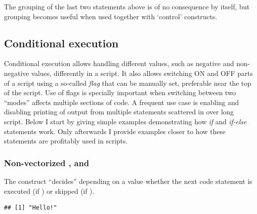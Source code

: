 \documentclass[krantz2]{krantz}\usepackage{knitr}%
\begin{document}
The grouping of the last two statements above is of no consequence by itself, but grouping becomes useful when used together with `control' constructs.

\subsection{Conditional execution}

Conditional execution allows handling different values, such as negative and non-negative values, differently in a script. It also allows switching ON and OFF parts of a script using a so-called \emph{flag} that can be manually set, preferable near the top of the script. Use of flags is specially important when switching between two ``modes'' affects multiple sections of code. A frequent use case is enabling and disabling printing of output from multiple statements scattered in over long script. Below I start by giving simple examples demonstrating how \emph{if} and \emph{if-else} statements work. Only afterwards I provide examples closer to how these statements are profitably used in \Rlang scripts.

\subsubsection[Non-vectorized \texttt{if}, \texttt{else} and \texttt{switch}]{Non-vectorized ,  and }
%

The  construct ``decides'' depending on a  value whether the next code statement is executed (if ) or skipped (if ).

\begin{knitrout}\footnotesize
{}\color{fgcolor}\begin{kframe}
\begin{alltt}
 \hlkwb{<-} 
  \hlstd{(}\hlstd{)}
\end{alltt}
\begin{verbatim}
## [1] "Hello!"
\end{verbatim}
\end{kframe}
\end{knitrout}
\end{document}
